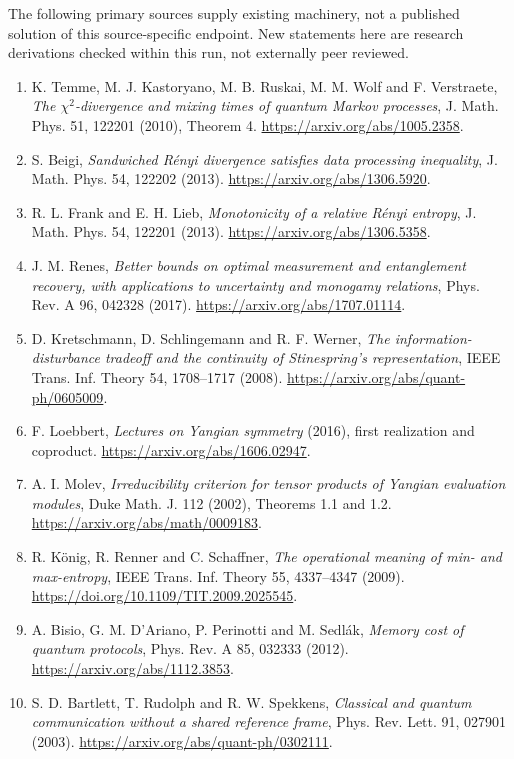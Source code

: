The following primary sources supply existing machinery, not a published
solution of this source-specific endpoint. New statements here are research
derivations checked within this run, not externally peer reviewed.
\begin{enumerate}
\item K. Temme, M. J. Kastoryano, M. B. Ruskai, M. M. Wolf and F. Verstraete,
\emph{The $\chi^2$-divergence and mixing times of quantum Markov processes},
J. Math. Phys. 51, 122201 (2010), Theorem 4.
\url{https://arxiv.org/abs/1005.2358}.
\item S. Beigi, \emph{Sandwiched R\'enyi divergence satisfies data processing
inequality}, J. Math. Phys. 54, 122202 (2013).
\url{https://arxiv.org/abs/1306.5920}.
\item R. L. Frank and E. H. Lieb, \emph{Monotonicity of a relative R\'enyi
entropy}, J. Math. Phys. 54, 122201 (2013).
\url{https://arxiv.org/abs/1306.5358}.
\item J. M. Renes, \emph{Better bounds on optimal measurement and entanglement
recovery, with applications to uncertainty and monogamy relations},
Phys. Rev. A 96, 042328 (2017). \url{https://arxiv.org/abs/1707.01114}.
\item D. Kretschmann, D. Schlingemann and R. F. Werner,
\emph{The information-disturbance tradeoff and the continuity of Stinespring's
representation}, IEEE Trans. Inf. Theory 54, 1708--1717 (2008).
\url{https://arxiv.org/abs/quant-ph/0605009}.
\item F. Loebbert, \emph{Lectures on Yangian symmetry} (2016), first realization
and coproduct. \url{https://arxiv.org/abs/1606.02947}.
\item A. I. Molev, \emph{Irreducibility criterion for tensor products of Yangian
evaluation modules}, Duke Math. J. 112 (2002), Theorems 1.1 and 1.2.
\url{https://arxiv.org/abs/math/0009183}.
\item R. K\"onig, R. Renner and C. Schaffner, \emph{The operational meaning of
min- and max-entropy}, IEEE Trans. Inf. Theory 55, 4337--4347 (2009).
\url{https://doi.org/10.1109/TIT.2009.2025545}.
\item A. Bisio, G. M. D'Ariano, P. Perinotti and M. Sedl\'ak,
\emph{Memory cost of quantum protocols}, Phys. Rev. A 85, 032333 (2012).
\url{https://arxiv.org/abs/1112.3853}.
\item S. D. Bartlett, T. Rudolph and R. W. Spekkens,
\emph{Classical and quantum communication without a shared reference frame},
Phys. Rev. Lett. 91, 027901 (2003).
\url{https://arxiv.org/abs/quant-ph/0302111}.

\end{enumerate}
